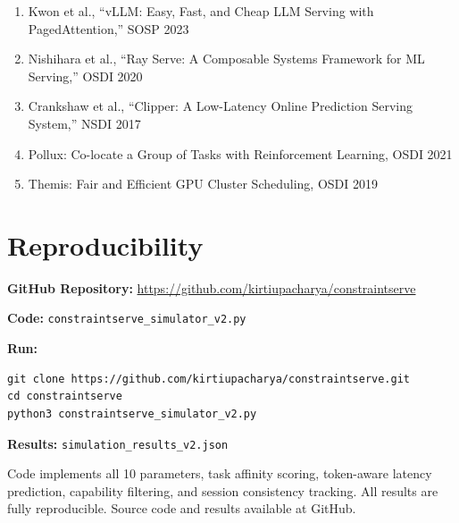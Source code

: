 \documentclass[11pt]{article}
\begin{document}
\begin{enumerate}
    \item Kwon et al., ``vLLM: Easy, Fast, and Cheap LLM Serving with PagedAttention,'' SOSP 2023
    \item Nishihara et al., ``Ray Serve: A Composable Systems Framework for ML Serving,'' OSDI 2020
    \item Crankshaw et al., ``Clipper: A Low-Latency Online Prediction Serving System,'' NSDI 2017
    \item Pollux: Co-locate a Group of Tasks with Reinforcement Learning, OSDI 2021
    \item Themis: Fair and Efficient GPU Cluster Scheduling, OSDI 2019
\end{enumerate}

\section*{Reproducibility}

\textbf{GitHub Repository:} \url{https://github.com/kirtiupacharya/constraintserve}

\textbf{Code:} \texttt{constraintserve\_simulator\_v2.py}

\textbf{Run:}
\begin{verbatim}
git clone https://github.com/kirtiupacharya/constraintserve.git
cd constraintserve
python3 constraintserve_simulator_v2.py
\end{verbatim}

\textbf{Results:} \texttt{simulation\_results\_v2.json}

Code implements all 10 parameters, task affinity scoring, token-aware latency prediction, capability filtering, and session consistency tracking. All results are fully reproducible. Source code and results available at GitHub.
\end{document}
